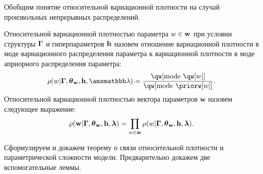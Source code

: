 Обобщим понятие относительной вариационной плотности на случай произвольных непрерывных распределений.
\begin{defin}
Относительной вариационной   плотностью параметра $w \in \mathbf{w}$  при условии структуры $\boldsymbol{\Gamma}$ и гиперпараметров $\mathbf{h}$ назовем отношение вариационной плотности в моде вариационного распределения параметра к вариационной плотности в моде априорного распределения параметра:
\[
\rho(w|\G,\tetaw, \h,\Lamb)=\frac{\qw[\text{mode}~\qw[w]]}{\qw[\text{mode}~{\priorw[w]}]}.
\]
Относительной вариационной плотностью вектора параметров $\mathbf{w}$ назовем следующее выражение:
\[
    {\rho}(\mathbf{w}|\boldsymbol{\Gamma}, \boldsymbol{\theta}_\mathbf{w}, \mathbf{h},\boldsymbol{\lambda}) = \prod_{w \in \mathbf{w}}\rho(w|\boldsymbol{\Gamma},\boldsymbol{\theta}_\mathbf{w},\mathbf{h},\boldsymbol{\lambda}).
\]

\end{defin}

Сформулируем и докажем теорему о связи относительной плотности и параметрической сложности модели. Предварительно докажем две вспомогательные леммы.

